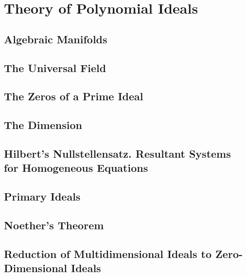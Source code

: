 \section{Theory of Polynomial Ideals}

\subsection{Algebraic Manifolds}

\subsection{The Universal Field}

\subsection{The Zeros of a Prime Ideal}

\subsection{The Dimension}

\subsection{Hilbert's Nullstellensatz. Resultant Systems for Homogeneous Equations}

\subsection{Primary Ideals}

\subsection{Noether's Theorem}

\subsection{Reduction of Multidimensional Ideals to Zero-Dimensional Ideals}